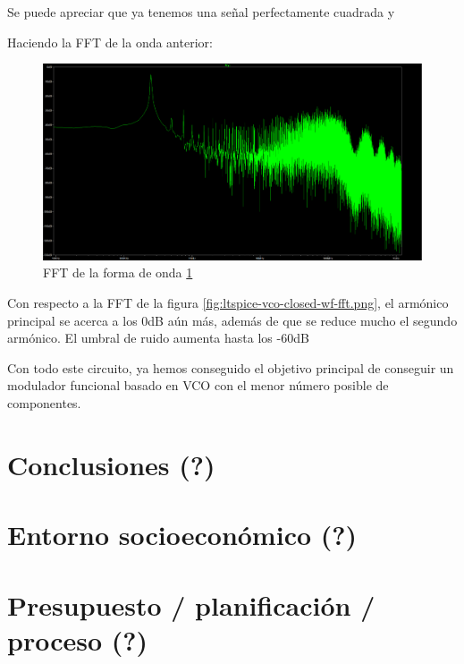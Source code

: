 \documentclass[12pt]{report} %
\begin{document}
	Se puede apreciar que ya tenemos una señal perfectamente cuadrada y %
	
	Haciendo la FFT de la onda anterior:
	
	\begin{figure}[H]
		\includegraphics[width=\textwidth]{ltspice-vco-closed-diff-wf-fft.PNG}
		\caption[FFT de la forma de onda \ref{fig:ltspice-vco-closed-diff-wf.png}]{FFT de la forma de onda \ref{fig:ltspice-vco-closed-diff-wf-fft.PNG}}
		\label{fig:ltspice-vco-closed-diff-wf-fft.PNG}
	\end{figure}
	
	Con respecto a la FFT de la figura \ref{fig:ltspice-vco-closed-wf-fft.png}, el armónico principal se acerca a los 0dB aún más, además de que se reduce mucho el segundo armónico. El umbral de ruido aumenta hasta los -60dB %
	
	Con todo este circuito, ya hemos conseguido el objetivo principal de conseguir un modulador funcional basado en VCO con el menor número posible de componentes.
	
	
\chapter{Conclusiones (?)}
\chapter{Entorno socioeconómico (?)}
\chapter{Presupuesto / planificación / proceso (?)}

\end{document}
